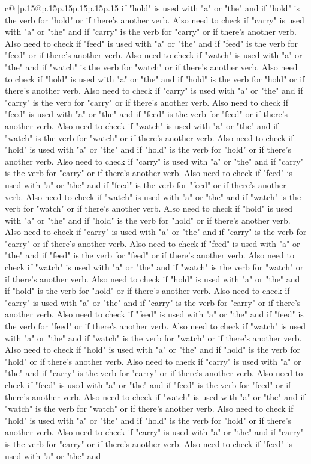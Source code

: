 \documentclass{article}
\begin{document}
{\begin{supertabular}{c@{$\;$}|p{.15\linewidth}@{}p{.15\linewidth}p{.15\linewidth}p{.15\linewidth}p{.15\linewidth}p{.15\linewidth}}
{{{if "hold" is used with "a" or "the" and if "hold" is the verb for "hold" or if there's another verb. Also need to check if "carry" is used with "a" or "the" and if "carry" is the verb for "carry" or if there's another verb. Also need to check if "feed" is used with "a" or "the" and if "feed" is the verb for "feed" or if there's another verb. Also need to check if "watch" is used with "a" or "the" and if "watch" is the verb for "watch" or if there's another verb. Also need to check if "hold" is used with "a" or "the" and if "hold" is the verb for "hold" or if there's another verb. Also need to check if "carry" is used with "a" or "the" and if "carry" is the verb for "carry" or if there's another verb. Also need to check if "feed" is used with "a" or "the" and if "feed" is the verb for "feed" or if there's another verb. Also need to check if "watch" is used with "a" or "the" and if "watch" is the verb for "watch" or if there's another verb. Also need to check if "hold" is used with "a" or "the" and if "hold" is the verb for "hold" or if there's another verb. Also need to check if "carry" is used with "a" or "the" and if "carry" is the verb for "carry" or if there's another verb. Also need to check if "feed" is used with "a" or "the" and if "feed" is the verb for "feed" or if there's another verb. Also need to check if "watch" is used with "a" or "the" and if "watch" is the verb for "watch" or if there's another verb. Also need to check if "hold" is used with "a" or "the" and if "hold" is the verb for "hold" or if there's another verb. Also need to check if "carry" is used with "a" or "the" and if "carry" is the verb for "carry" or if there's another verb. Also need to check if "feed" is used with "a" or "the" and if "feed" is the verb for "feed" or if there's another verb. Also need to check if "watch" is used with "a" or "the" and if "watch" is the verb for "watch" or if there's another verb. Also need to check if "hold" is used with "a" or "the" and if "hold" is the verb for "hold" or if there's another verb. Also need to check if "carry" is used with "a" or "the" and if "carry" is the verb for "carry" or if there's another verb. Also need to check if "feed" is used with "a" or "the" and if "feed" is the verb for "feed" or if there's another verb. Also need to check if "watch" is used with "a" or "the" and if "watch" is the verb for "watch" or if there's another verb. Also need to check if "hold" is used with "a" or "the" and if "hold" is the verb for "hold" or if there's another verb. Also need to check if "carry" is used with "a" or "the" and if "carry" is the verb for "carry" or if there's another verb. Also need to check if "feed" is used with "a" or "the" and if "feed" is the verb for "feed" or if there's another verb. Also need to check if "watch" is used with "a" or "the" and if "watch" is the verb for "watch" or if there's another verb. Also need to check if "hold" is used with "a" or "the" and if "hold" is the verb for "hold" or if there's another verb. Also need to check if "carry" is used with "a" or "the" and if "carry" is the verb for "carry" or if there's another verb. Also need to check if "feed" is used with "a" or "the" and }}}
\end{supertabular}}
\end{document}

